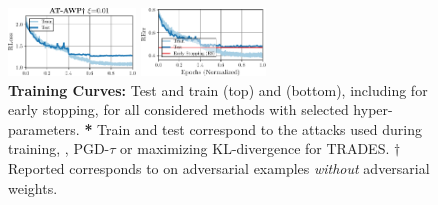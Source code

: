 \begin{figure}[t]
\begin{minipage}[t]{0.19\textwidth}
		\includegraphics[height=1.8cm]{plots_supp_training_curves_awit001_loss}
		
		\hspace*{-0cm}
		\includegraphics[height=1.8cm]{plots_supp_training_curves_awit001_error}
	\end{minipage}
	\begin{minipage}[t]{0.01\textwidth}
		\vspace*{0px}
		
		\hfill
	\end{minipage}
	\begin{minipage}[t]{0.38\textwidth}
		\vspace*{4px}
		
		\caption{\textbf{Training Curves:} Test and train \RCE (top) and \RTE (bottom), including \RTE for early stopping, for all considered methods with selected hyper-parameters. \textbf{*} Train and test \RCE correspond to the attacks used during training, \eg, PGD-$\tau$ or maximizing KL-divergence for TRADES. \textbf{$\dagger$} Reported \RCE corresponds to \RCE on adversarial examples \emph{without} adversarial weights.}
		\label{fig:supp-training-curves}
	\end{minipage}
\end{figure}
